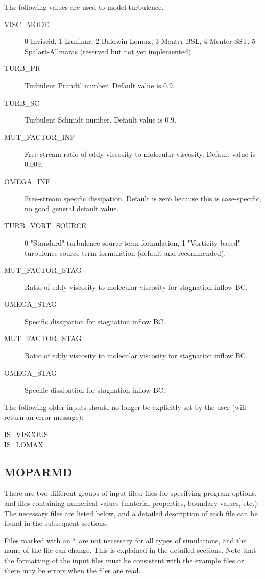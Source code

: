\documentclass[]{article}
\begin{document}
\noindent The following values are used to model turbulence.
\begin{description}
 \item [VISC\_MODE] 0 Inviscid,  1 Laminar,  2 Baldwin-Lomax,   3 Menter-BSL,  4 Menter-SST, 5 Spalart-Allmaras (reserved but not yet implemented)
 \item [TURB\_PR] Turbulent Prandtl number.  Default value is 0.9.
 \item [TURB\_SC] Turbulent Schmidt number.  Default value is 0.9.
 \item [MUT\_FACTOR\_INF] Free-stream ratio of eddy viscosity to molecular viscosity.  Default value is 0.009.
 \item [OMEGA\_INF] Free-stream specific dissipation. Default is zero because this is case-specific, no good general default value.
 \item [TURB\_VORT\_SOURCE] 0 "Standard" turbulence source term formulation,  1 "Vorticity-based" turbulence source term formulation (default and recommended).
 \item [MUT\_FACTOR\_STAG] Ratio of eddy viscosity to molecular viscosity for stagnation inflow BC.
 \item [OMEGA\_STAG] Specific dissipation for stagnation inflow BC.
 \item [MUT\_FACTOR\_STAG] Ratio of eddy viscosity to molecular viscosity for stagnation inflow BC.
 \item [OMEGA\_STAG] Specific dissipation for stagnation inflow BC.
\end{description}

\noindent The following older inputs should no longer be explicitly set by the user (will return an error message):
\begin{description}
\item [IS\_VISCOUS]
\item [IS\_LOMAX]
\end{description}


\subsection{MOPARMD}

There are two different groups of input files: files for specifying program options, and files containing numerical values (material properties, boundary values, etc.). The necessary files are listed below, and a detailed description of each file can be found in the subsequent sections. 

Files marked with an * are not necessary for all types of simulations, and the name of the file can change. This is explained in the detailed sections. Note that the formatting of the input files must be consistent with the example files or there may be errors when the files are read.
\end{document}
